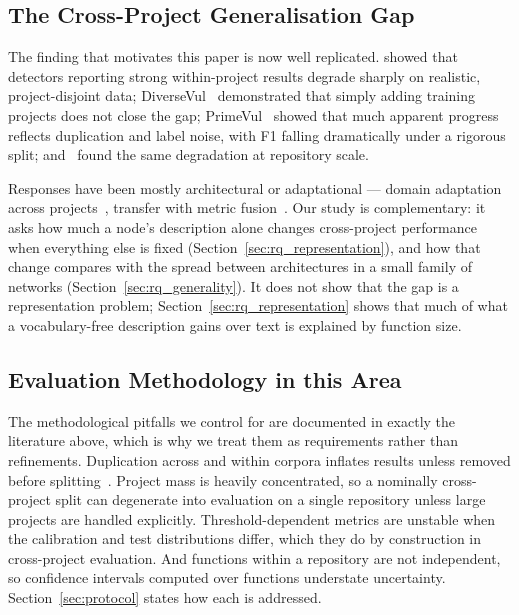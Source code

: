 \documentclass[pdflatex,sn-basic]{sn-jnl}
\theoremstyle{thmstyleone}%
\begin{document}
\subsection{The Cross-Project Generalisation Gap}
The finding that motivates this paper is now well replicated. \citet{chakraborty2022deep} showed that detectors reporting strong
within-project results degrade sharply on realistic, project-disjoint data;
DiverseVul~\citep{chen2023diversevul} demonstrated that simply adding training
projects does not close the gap; PrimeVul~\citep{ding2025primevul} showed that
much apparent progress reflects duplication and label noise, with F1 falling
dramatically under a rigorous split; and~\citep{chakraborty2024realvul} found
the same degradation at repository scale.

Responses have been mostly architectural or adaptational --- domain adaptation
across projects~\citep{liu2022cdvuld, zhang2023cpvd, li2023vulgda}, transfer
with metric fusion~\citep{cai2024csvdtf}. Our study is complementary: it
asks how much a node's description alone changes cross-project performance
when everything else is fixed (Section~\ref{sec:rq_representation}), and how that
change compares with the spread between architectures in a small family of
networks (Section~\ref{sec:rq_generality}). It does not show that the gap is a
representation problem; Section~\ref{sec:rq_representation} shows that much of
what a vocabulary-free description gains over text is explained by function
size.

\subsection{Evaluation Methodology in this Area}
The methodological pitfalls we control for are documented in exactly the
literature above, which is why we treat them as requirements rather than
refinements. Duplication across and within corpora inflates results unless
removed before splitting~\citep{ding2025primevul, chen2023diversevul}. Project
mass is heavily concentrated, so a nominally cross-project split can
degenerate into evaluation on a single repository unless large projects are
handled explicitly. Threshold-dependent metrics are unstable when the
calibration and test distributions differ, which they do by construction in
cross-project evaluation. And functions within a repository are not
independent, so confidence intervals computed over functions understate
uncertainty. Section~\ref{sec:protocol} states how each is addressed.
\end{document}
